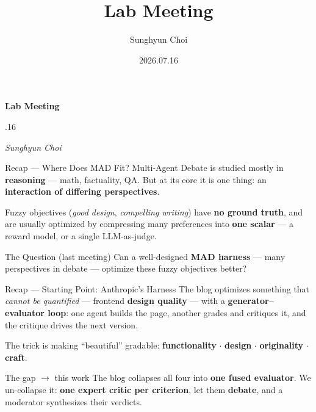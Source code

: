 \documentclass[aspectratio=169,10pt]{beamer}
\title{Lab Meeting}
\date{2026.07.16}
\author{Sunghyun Choi}
\begin{document}
\begin{frame}[plain]
    \vspace{1.2cm}
    \begin{center}
        {\fontsize{26}{32}\selectfont\bfseries\color{navymain} Lab Meeting}

        \vspace{0.4cm}
        {\fontsize{18}{22}.16}

        \vspace{0.4cm}
        {\fontsize{14}{18}\selectfont\itshape\color{black!70} Sunghyun Choi}
    \end{center}
\end{frame}

\begin{frame}{Recap --- Where Does MAD Fit?}
    \vspace{0.5cm}
    Multi-Agent Debate is studied mostly in \textbf{reasoning} --- math,
    factuality, QA. But at its core it is one thing: an
    \textbf{interaction of differing perspectives}.

    \vspace{0.5cm}
    Fuzzy objectives (\emph{good design}, \emph{compelling writing}) have
    \textbf{no ground truth}, and are usually optimized by compressing many
    preferences into \textbf{one scalar} --- a reward model, or a single
    LLM-as-judge.

    \vspace{0.6cm}
    \begin{block}{The Question (last meeting)}
        Can a well-designed \textbf{MAD harness} --- many perspectives in
        debate --- optimize these fuzzy objectives better?
    \end{block}
\end{frame}

\begin{frame}{Recap --- Starting Point: Anthropic's Harness}
    \vspace{0.5cm}
    The blog optimizes something that \emph{cannot be quantified} --- frontend
    \textbf{design quality} --- with a \textbf{generator--evaluator loop}: one
    agent builds the page, another grades and critiques it, and the critique
    drives the next version.

    \vspace{0.4cm}
    The trick is making ``beautiful'' gradable:
    \textbf{functionality} $\cdot$ \textbf{design} $\cdot$
    \textbf{originality} $\cdot$ \textbf{craft}.

    \vspace{0.5cm}
    \begin{alertblock}{The gap $\to$ this work}
        The blog collapses all four into \textbf{one fused evaluator}.
        We un-collapse it: \textbf{one expert critic per criterion}, let them
        \textbf{debate}, and a moderator synthesizes their verdicts.
    \end{alertblock}
\end{frame}
\end{document}
